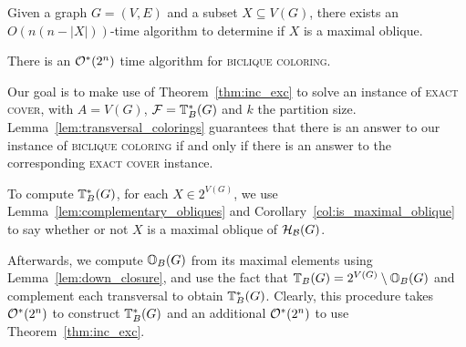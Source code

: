 \begin{corollary}
    \label{col:is_maximal_oblique}
    Given a graph $G = (V, E)$ and a subset $X \subseteq V(G)$, there exists an $O(n(n - |X|))$-time algorithm to determine if $X$ is a maximal oblique.
\end{corollary}

\begin{theorem}
    There is an $\mathcal{O}^*\!\left(2^n\right)$ time algorithm for \textsc{biclique coloring}.
\end{theorem}

\begin{tproof}
    Our goal is to make use of Theorem~\ref{thm:inc_exc} to solve an instance of \textsc{exact cover}, with $A = V(G)$, $\mathcal{F} = \mathbb{T}^*_{B}(G)$ and $k$ the partition size.
    Lemma~\ref{lem:transversal_colorings} guarantees that there is an answer to our instance of \textsc{biclique coloring} if and only if there is an answer to the corresponding \textsc{exact cover} instance.
    
    To compute $\mathbb{T}^*_{B}(G)$, for each $X \in 2^{V(G)}$, we use Lemma~\ref{lem:complementary_obliques} and Corollary~\ref{col:is_maximal_oblique} to say whether or not $X$ is a maximal oblique of $\mathcal{H}_{\mathcal{B}}(G)$.
    
    Afterwards, we compute $\mathbb{O}_{B}(G)$ from its maximal elements using Lemma~\ref{lem:down_closure}, and use the fact that $\mathbb{T}_{B}(G) = 2^{V(G)} \setminus \mathbb{O}_{B}(G)$ and complement each transversal to obtain $\mathbb{T}^*_{B}(G)$.
    Clearly, this procedure takes $\mathcal{O}^*\!\left(2^n\right)$ to construct $\mathbb{T}^*_{B}(G)$ and an additional $\mathcal{O}^*\!\left(2^n\right)$ to use Theorem~\ref{thm:inc_exc}.
\end{tproof}